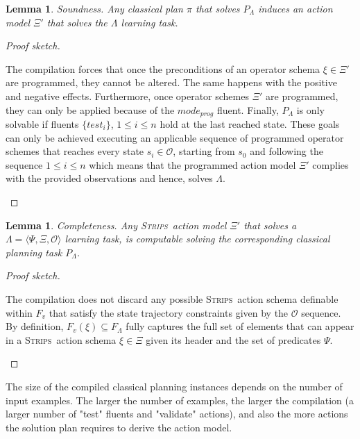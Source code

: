\documentclass{article}
\newcommand{\tup}[1]{{\langle #1 \rangle}}
\newcommand{\strips}{\textsc{Strips}}     %
\newtheorem{lemma}[theorem]{Lemma}
\begin{document}
\begin{lemma}
Soundness. Any classical plan $\pi$ that solves $P_{\Lambda}$ induces an action model $\Xi'$ that solves the $\Lambda$ learning task.
\end{lemma}

\begin{proof}[Proof sketch]
\begin{small}
The compilation forces that once the preconditions of an operator schema $\xi \in \Xi'$ are programmed, they cannot be altered. The same happens with the positive and negative effects. Furthermore, once operator schemes $\Xi'$ are programmed, they can only be applied because of the $mode_{prog}$ fluent. Finally, $P_{\Lambda}$ is only solvable if fluents $\{test_i\}$, {\small $1\leq i\leq n$} hold at the last reached state. These goals can only be achieved executing an applicable sequence of programmed operator schemes that reaches every state $s_i\in\mathcal{O}$, starting from $s_0$ and following the sequence {\small $1\leq i\leq n$} which means that the programmed action model $\Xi'$ complies with the provided observations and hence, solves $\Lambda$.
\end{small}
\end{proof}


\begin{lemma}
Completeness. Any \strips\ action model $\Xi'$ that solves a $\Lambda=\tup{\Psi,\Xi,\mathcal{O}}$ learning task, is computable solving the corresponding classical planning task $P_{\Lambda}$.
\end{lemma}

\begin{proof}[Proof sketch]
\begin{small}
The compilation does not discard any possible \strips\ action schema definable within $F_v$ that satisfy the state trajectory constraints given by the $\mathcal{O}$ sequence. By definition, $F_v(\xi)\subseteq F_\Lambda$ fully captures the full set of elements that can appear in a \strips\ action schema $\xi\in\Xi$ given its header and the set of predicates $\Psi$.
\end{small}
\end{proof}

The size of the compiled classical planning instances depends on the number of input examples. The larger the number of examples, the larger the compilation (a larger number of "test" fluents and "validate" actions), and also the more actions the solution plan requires to derive the action model.
\end{document}
